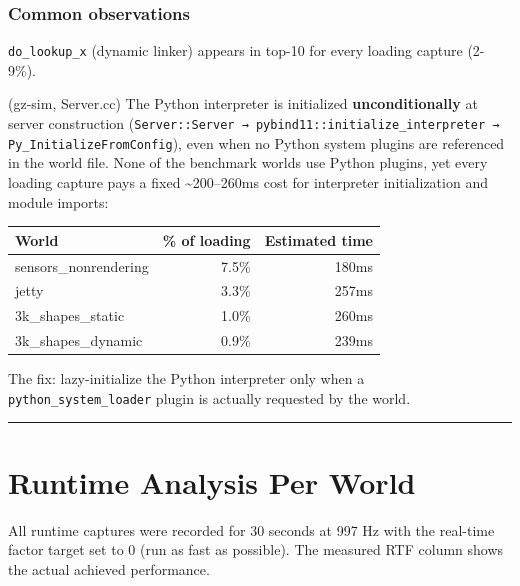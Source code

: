 \documentclass[11pt, a4paper]{article}
\begin{document}
\subsubsection*{Common observations}

\texttt{do\_lookup\_x} (dynamic linker) appears in top-10 for every loading capture (2-9\%).

\begin{description}[style=nextline, leftmargin=1.5cm]
\item[\texttt{pybind11::initialize\_interpreter}] (gz-sim, Server.cc) The Python interpreter is initialized \textbf{unconditionally} at server construction (\texttt{Server::Server → pybind11::initialize\_interpreter → Py\_InitializeFromConfig}), even when no Python system plugins are referenced in the world file. None of the benchmark worlds use Python plugins, yet every loading capture pays a fixed \textasciitilde 200--260ms cost for interpreter initialization and module imports:

\begin{center}
\begin{tabular}{lrr}
\toprule
World & \% of loading & Estimated time \\
\midrule
sensors\_nonrendering & 7.5\% & 180ms \\
jetty & 3.3\% & 257ms \\
3k\_shapes\_static & 1.0\% & 260ms \\
3k\_shapes\_dynamic & 0.9\% & 239ms \\
\bottomrule
\end{tabular}
\end{center}

The fix: lazy-initialize the Python interpreter only when a \texttt{python\_system\_loader} plugin is actually requested by the world.
\end{description}

\begin{center}\rule{0.5\linewidth}{0.5pt}\end{center}

\hypertarget{runtime-analysis-per-world}{%
\section{Runtime Analysis Per
World}\label{runtime-analysis-per-world}}

All runtime captures were recorded for 30 seconds at 997 Hz with the real-time factor target set to 0 (run as fast as possible). The measured RTF column shows the actual achieved performance.
\end{document}
